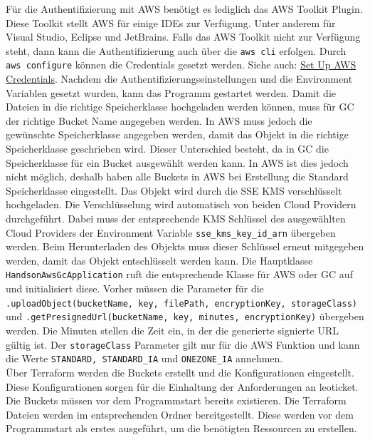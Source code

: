 Für die Authentifizierung mit AWS benötigt es lediglich das AWS Toolkit Plugin. Diese Toolkit stellt AWS für einige IDEs zur Verfügung. Unter anderem für Visual Studio, Eclipse und JetBrains. Falls das AWS Toolkit nicht zur Verfügung steht, dann kann die Authentifizierung auch über die \verb|aws cli| erfolgen. Durch \verb|aws configure| können die Credentials gesetzt werden. Siehe auch: \href{https://docs.aws.amazon.com/sdk-for-java/latest/developer-guide/setup-basics.html}{Set Up AWS Credentials}. Nachdem die Authentifizierungseinstellungen und die Environment Variablen gesetzt wurden, kann das Programm gestartet werden. Damit die Dateien in die richtige Speicherklasse hochgeladen werden können, muss für GC der richtige Bucket Name angegeben werden. In AWS muss jedoch die gewünschte Speicherklasse angegeben werden, damit das Objekt in die richtige Speicherklasse geschrieben wird. Dieser Unterschied besteht, da in GC die Speicherklasse für ein Bucket ausgewählt werden kann. In AWS ist dies jedoch nicht möglich, deshalb haben alle Buckets in AWS bei Erstellung die Standard Speicherklasse eingestellt. Das Objekt wird durch die SSE KMS verschlüsselt hochgeladen. Die Verschlüsselung wird automatisch von beiden Cloud Providern durchgeführt. Dabei muss der entsprechende KMS Schlüssel des ausgewählten Cloud Providers der Environment Variable \verb|sse_kms_key_id_arn| übergeben werden. Beim Herunterladen des Objekts muss dieser Schlüssel erneut mitgegeben werden, damit das Objekt entschlüsselt werden kann. Die Hauptklasse \verb|HandsonAwsGcApplication| ruft die entsprechende Klasse für AWS oder GC auf und initialisiert diese. Vorher müssen die Parameter für die \verb|.uploadObject(bucketName, key, filePath, encryptionKey, storageClass)| und \verb|.getPresignedUrl(bucketName, key, minutes, encryptionKey)| übergeben werden. Die Minuten stellen die Zeit ein, in der die generierte signierte URL gültig ist. Der \verb|storageClass| Parameter gilt nur für die AWS Funktion und kann die Werte \verb|STANDARD, STANDARD_IA| und \verb|ONEZONE_IA| annehmen.\\

Über Terraform werden die Buckets erstellt und die Konfigurationen eingestellt. Diese Konfigurationen sorgen für die Einhaltung der Anforderungen an leoticket. Die Buckets müssen vor dem Programmstart bereits existieren. Die Terraform Dateien werden im entsprechenden Ordner bereitgestellt. Diese werden vor dem Programmstart als erstes ausgeführt, um die benötigten Ressourcen zu erstellen.\\

